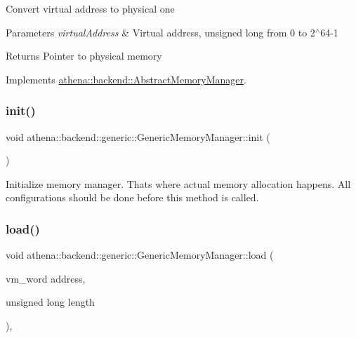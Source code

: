 Convert virtual address to physical one 
\begin{DoxyParams}{Parameters}
{\em virtual\+Address} & Virtual address, unsigned long from 0 to 2$^\wedge$64-\/1 \\
\hline
\end{DoxyParams}
\begin{DoxyReturn}{Returns}
Pointer to physical memory 
\end{DoxyReturn}


Implements \mbox{\hyperlink{classathena_1_1backend_1_1_abstract_memory_manager_ad441d7a2281f5f2b2627272d136f72b8}{athena\+::backend\+::\+Abstract\+Memory\+Manager}}.

\mbox{\label{classathena_1_1backend_1_1generic_1_1_generic_memory_manager_a129008275aca0577c3ef6d0acd387b02}} 
\subsubsection{\texorpdfstring{init()}{init()}}
{\footnotesize\ttfamily void athena\+::backend\+::generic\+::\+Generic\+Memory\+Manager\+::init (\begin{DoxyParamCaption}{ }\end{DoxyParamCaption})}

Initialize memory manager. That\textquotesingle{}s where actual memory allocation happens. All configurations should be done before this method is called. \mbox{\label{classathena_1_1backend_1_1generic_1_1_generic_memory_manager_a43a30e3c9e0cc2d15defb44dfa3919c0}} 
\subsubsection{\texorpdfstring{load()}{load()}\hspace{0.1cm}{\footnotesize\ttfamily [1/2]}}
{\footnotesize\ttfamily void athena\+::backend\+::generic\+::\+Generic\+Memory\+Manager\+::load (\begin{DoxyParamCaption}\item[{vm\+\_\+word}]{address,  }\item[{unsigned long}]{length }\end{DoxyParamCaption})\hspace{0.3cm}{\ttfamily [override]}, {\ttfamily [virtual]}}

